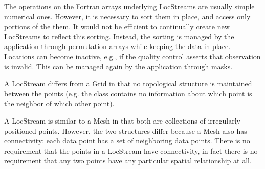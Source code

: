 The operations on the Fortran arrays underlying LocStreams are usually simple numerical ones. However,
it is necessary to sort them in place, and access only portions of the them. It would
not be efficient to continually create new LocStreams to reflect this sorting. Instead,
the sorting is managed by the application through permutation arrays while keeping
the data in place. Locations can become inactive, e.g., if the quality control asserts that
observation is invalid. This can be managed again by the application through masks.

A LocStream differs from a Grid in that no topological structure is
maintained between the points
(e.g. the class contains no information about which point is the neighbor
of which other point).

A LocStream is similar to a Mesh in that both are collections of irregularly positioned 
points.  However, the two structures differ because a Mesh also has connectivity: 
each data point has a set of neighboring data points. There is no requirement that the
points in a LocStream have connectivity, in fact there is no requirement that any two points 
have any particular spatial relationship at all.
